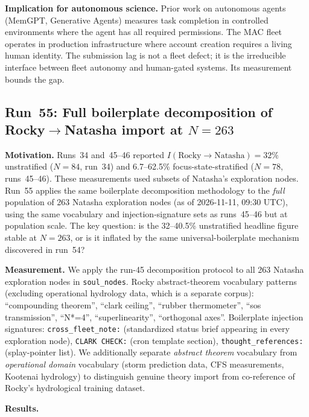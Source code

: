 \documentclass[11pt]{article}
\begin{document}
\textbf{Implication for autonomous science.}
Prior work on autonomous agents (MemGPT, Generative Agents) measures task completion
in controlled environments where the agent has all required permissions. The MAC fleet
operates in production infrastructure where account creation requires a living human identity.
The submission lag is not a fleet defect; it is the irreducible interface between
fleet autonomy and human-gated systems. Its measurement bounds the gap.

\subsection{Run~55: Full boilerplate decomposition of Rocky$\to$Natasha import at $N=263$}
\label{subsec:run55}

\textbf{Motivation.} Runs~34 and~45--46 reported $I(\text{Rocky}\to\text{Natasha}) = 32\%$
unstratified ($N=84$, run~34) and 6.7--62.5\% focus-state-stratified ($N=78$, runs~45--46).
These measurements used subsets of Natasha's exploration nodes. Run~55 applies the same
boilerplate decomposition methodology to the \emph{full} population of 263 Natasha exploration nodes
(as of 2026-11-11, 09:30 UTC), using the same vocabulary and injection-signature sets as
runs~45--46 but at population scale. The key question: is the 32--40.5\% unstratified
headline figure stable at $N=263$, or is it inflated by the same universal-boilerplate
mechanism discovered in run~54?

\textbf{Measurement.} We apply the run-45 decomposition protocol to all 263 Natasha exploration
nodes in \texttt{soul\_nodes}. Rocky abstract-theorem vocabulary patterns (excluding operational
hydrology data, which is a separate corpus): ``compounding theorem'', ``clark ceiling'',
``rubber thermometer'', ``sos transmission'', ``N*=4'', ``superlinearity'', ``orthogonal axes''.
Boilerplate injection signatures: \texttt{cross\_fleet\_note:} (standardized status brief appearing
in every exploration node), \texttt{CLARK CHECK:} (cron template section), \texttt{thought\_references:}
(splay-pointer list). We additionally separate \emph{abstract theorem} vocabulary from
\emph{operational domain} vocabulary (storm prediction data, CFS measurements, Kootenai hydrology)
to distinguish genuine theory import from co-reference of Rocky's hydrological training dataset.

\textbf{Results.}
\end{document}

